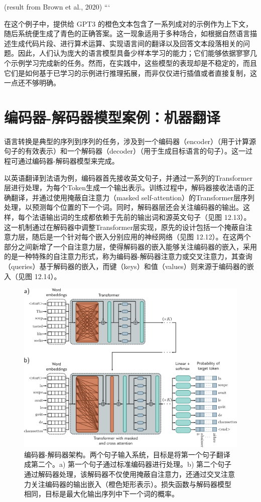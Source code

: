 (result from Brown et al., 2020)
```

在这个例子中，提供给 GPT3 的橙色文本包含了一系列成对的示例作为上下文，随后系统便生成了青色的正确答案。这一现象适用于多种场合，如根据自然语言描述生成代码片段、进行算术运算、实现语言间的翻译以及回答文本段落相关的问题。因此，人们认为庞大的语言模型具备少样本学习的能力；它们能够依据寥寥几个示例学习完成新的任务。然而，在实践中，这些模型的表现却是不稳定的，而且它们是如何基于已学习的示例进行推理拓展，而非仅仅进行插值或者直接复制，这一点还不够明确。

\section{编码器-解码器模型案例：机器翻译}
语言转换是典型的序列到序列的任务，涉及到一个编码器（encoder）（用于计算源句子的有效表示）和一个解码器（decoder）（用于生成目标语言的句子）。这一过程可通过编码器-解码器模型来完成。

以英语翻译到法语为例，编码器首先接收英文句子，并通过一系列的Transformer层进行处理，为每个Token生成一个输出表示。训练过程中，解码器接收法语的正确翻译，并通过使用掩蔽自注意力（masked self-attention）的Transformer层序列处理，以预测每个位置的下一个词。同时，解码器层还会关注编码器的输出。这样，每个法语输出词的生成都依赖于先前的输出词和源英文句子（见图 12.13）。这一机制通过在解码器中调整Transformer层实现，原先的设计包括一个掩蔽自注意力层，随后是一个针对每个嵌入分别应用的神经网络（见图 12.12）。在这两个部分之间新增了一个自注意力层，使得解码器的嵌入能够关注编码器的嵌入，采用的是一种特殊的自注意力形式，称为编码器-解码器注意力或交叉注意力，其查询（queries）基于解码器的嵌入，而键（keys）和值（values）则来源于编码器的嵌入（见图 12.14）。

\begin{figure}[ht!]
\centering
\includegraphics[width=0.7\linewidth]{png/chapter12/TransformerEncoderDecoder.png}
\caption{编码器-解码器架构。两个句子输入系统，目标是将第一个句子翻译成第二个。a) 第一个句子通过标准编码器进行处理。b) 第二个句子通过解码器处理，该解码器不仅使用掩蔽自注意力，还通过交叉注意力关注编码器的输出嵌入（橙色矩形表示）。损失函数与解码器模型相同，目标是最大化输出序列中下一个词的概率。}
\end{figure}


